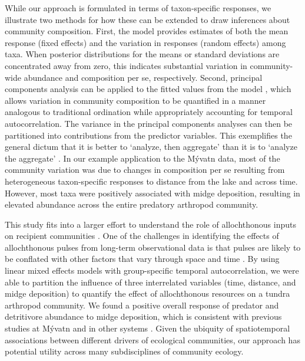 While our approach is formulated in terms of taxon-specific responses,
we illustrate two methods for how these can be extended to draw inferences about community composition.
First, the model provides estimates of both the mean response (fixed effects) 
and the variation in responses (random effects) among taxa.
When posterior distributions for the means or standard deviations are concentrated away from zero,
this indicates substantial variation in community-wide abundance and composition per se, respectively. 
Second, principal components analysis can be applied to the fitted values from the model \citep[similar to][]{Jackson2012}, 
which allows variation in community composition to be quantified in a manner analogous to traditional ordination
while appropriately accounting for temporal autocorrelation. 
The variance in the principal components analyses can then be partitioned into contributions from the predictor variables.
This exemplifies the general dictum that it is better to `analyze, then aggregate' than it
is to `analyze the aggregate' \citep{Clark2011}.
In our example application to the M\'{y}vatn data,
most of the community variation was due to changes in composition per se
resulting from heterogeneous taxon-specific responses to distance from the lake and across time.
However, most taxa were positively associated with midge deposition,
resulting in elevated abundance across the entire predatory arthropod community.



This study fits into a larger effort to understand the role 
of allochthonous inputs on recipient communities \citep{Polis1997, Mccary2020}.
One of the challenges in identifying the effects of allochthonous pulses 
from long-term observational data is that pulses are likely to be conflated
with other factors that vary through space and time \citep{Yang2008}.
By using linear mixed effects models with group-specific temporal autocorrelation, 
we were able to partition the influence of three interrelated variables (time, distance, and midge deposition) 
to quantify the effect of allochthonous resources on a tundra arthropod community.
We found a positive overall response of predator and detritivore abundance to midge deposition, which
is consistent with previous studies at M\'{y}vatn \citep{Hoekman2011, Dreyer2012, Sanchez2018}
and in other systems \citep{Ostfeld2000, Murphy2012}.
Given the ubiquity of spatiotemporal associations between different drivers of ecological communities, 
our approach has potential utility across many subdisciplines of community ecology.

